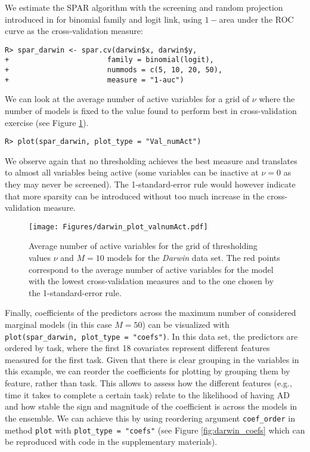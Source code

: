\documentclass[
  article,
  nojss]{jss}
\begin{document}
We estimate the SPAR algorithm with the screening and random projection
introduced in \citet{parzer2024glms} for binomial family and logit link,
using \(1-\)area under the ROC curve as the cross-validation measure:

\begin{verbatim}
R> spar_darwin <- spar.cv(darwin$x, darwin$y,
+                       family = binomial(logit),
+                       nummods = c(5, 10, 20, 50),
+                       measure = "1-auc")
\end{verbatim}

We can look at the average number of active variables for a grid of
\(\nu\) where the number of models is fixed to the value found to
perform best in cross-validation exercise (see Figure
\ref{fig:darwin_activevars}).

\begin{verbatim}
R> plot(spar_darwin, plot_type = "Val_numAct")
\end{verbatim}

We observe again that no thresholding achieves the best measure and
translates to almost all variables being active (some variables can be
inactive at \(\nu=0\) as they may never be screened). The
1-standard-error rule would however indicate that more sparsity can be
introduced without too much increase in the cross-validation measure.

\begin{figure}[t!]
\centering
\texttt{[image: Figures/darwin\_plot\_valnumAct.pdf]}
\caption{Average number of active variables for the grid of thresholding values 
$\nu$ and $M=10$ models for the \emph{Darwin} data set. The red points 
correspond to the average number of active variables for the model with the 
lowest cross-validation measures and to the one chosen by the 1-standard-error 
rule. \label{fig:darwin_activevars}}
\end{figure}

Finally, coefficients of the predictors across the maximum number of
considered marginal models (in this case \(M=50\)) can be visualized
with \texttt{plot(spar\_darwin,\ plot\_type\ =\ "coefs")}. In this data
set, the predictors are ordered by task, where the first 18 covariates
represent different features measured for the first task. Given that
there is clear grouping in the variables in this example, we can reorder
the coefficients for plotting by grouping them by feature, rather than
task. This allows to assess how the different features (e.g., time it
takes to complete a certain task) relate to the likelihood of having AD
and how stable the sign and magnitude of the coefficient is across the
models in the ensemble. We can achieve this by using reordering argument
\texttt{coef\_order} in method \texttt{plot} with
\texttt{plot\_type\ =\ "coefs"} (see Figure \ref{fig:darwin_coefs} which
can be reproduced with code in the supplementary materials).
\end{document}
